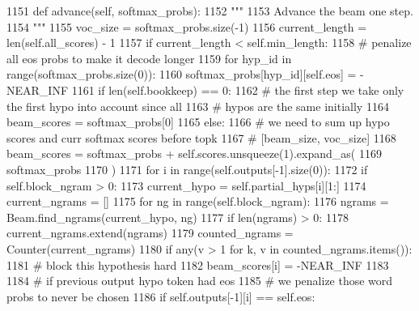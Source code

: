 \begin{DoxyCode}
1151     \textcolor{keyword}{def }advance(self, softmax\_probs):
1152         \textcolor{stringliteral}{"""}
1153 \textcolor{stringliteral}{        Advance the beam one step.}
1154 \textcolor{stringliteral}{        """}
1155         voc\_size = softmax\_probs.size(-1)
1156         current\_length = len(self.all\_scores) - 1
1157         \textcolor{keywordflow}{if} current\_length < self.min\_length:
1158             \textcolor{comment}{# penalize all eos probs to make it decode longer}
1159             \textcolor{keywordflow}{for} hyp\_id \textcolor{keywordflow}{in} range(softmax\_probs.size(0)):
1160                 softmax\_probs[hyp\_id][self.eos] = -NEAR\_INF
1161         \textcolor{keywordflow}{if} len(self.bookkeep) == 0:
1162             \textcolor{comment}{# the first step we take only the first hypo into account since all}
1163             \textcolor{comment}{# hypos are the same initially}
1164             beam\_scores = softmax\_probs[0]
1165         \textcolor{keywordflow}{else}:
1166             \textcolor{comment}{# we need to sum up hypo scores and curr softmax scores before topk}
1167             \textcolor{comment}{# [beam\_size, voc\_size]}
1168             beam\_scores = softmax\_probs + self.scores.unsqueeze(1).expand\_as(
1169                 softmax\_probs
1170             )
1171             \textcolor{keywordflow}{for} i \textcolor{keywordflow}{in} range(self.outputs[-1].size(0)):
1172                 \textcolor{keywordflow}{if} self.block\_ngram > 0:
1173                     current\_hypo = self.partial\_hyps[i][1:]
1174                     current\_ngrams = []
1175                     \textcolor{keywordflow}{for} ng \textcolor{keywordflow}{in} range(self.block\_ngram):
1176                         ngrams = Beam.find\_ngrams(current\_hypo, ng)
1177                         \textcolor{keywordflow}{if} len(ngrams) > 0:
1178                             current\_ngrams.extend(ngrams)
1179                     counted\_ngrams = Counter(current\_ngrams)
1180                     \textcolor{keywordflow}{if} any(v > 1 \textcolor{keywordflow}{for} k, v \textcolor{keywordflow}{in} counted\_ngrams.items()):
1181                         \textcolor{comment}{# block this hypothesis hard}
1182                         beam\_scores[i] = -NEAR\_INF
1183 
1184                 \textcolor{comment}{#  if previous output hypo token had eos}
1185                 \textcolor{comment}{# we penalize those word probs to never be chosen}
1186                 \textcolor{keywordflow}{if} self.outputs[-1][i] == self.eos:

\end{DoxyCode}
